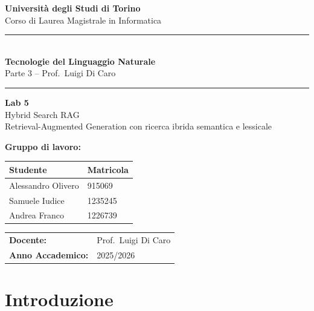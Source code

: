 \documentclass[12pt,a4paper]{article}
\newcommand{\HRule}{\rule{\linewidth}{0.5mm}}
\begin{document}
\raggedbottom

\begin{titlepage}
  \centering
  \vspace*{1.5cm}

  {\Large\textbf{Universit\`a degli Studi di Torino}\\[0.3em]
  Corso di Laurea Magistrale in Informatica}

  \vspace{1cm}
  \HRule\\[0.4em]
  {\LARGE\textbf{Tecnologie del Linguaggio Naturale}}\\[0.3em]
  {\large Parte 3 -- Prof.\ Luigi Di Caro}\\[0.2em]
  \HRule

  \vspace{1.2cm}
  {\huge\textbf{Lab 5}}\\[0.5em]
  {\LARGE Hybrid Search RAG}\\[0.4em]
  {\large Retrieval-Augmented Generation con ricerca ibrida semantica e lessicale}

  \vspace{2cm}

  {\large\textbf{Gruppo di lavoro:}}\\[0.8em]
  \begin{tabular}{ll}
    \toprule
    \textbf{Studente}    & \textbf{Matricola} \\
    \midrule
    Alessandro Olivero   & 915069  \\
    Samuele Iudice       & 1235245 \\
    Andrea Franco        & 1226739 \\
    \bottomrule
  \end{tabular}

  \vspace{1.5cm}
  \begin{tabular}{ll}
    \textbf{Docente:}          & Prof.\ Luigi Di Caro \\[0.3em]
    \textbf{Anno Accademico:}  & 2025/2026 \\
  \end{tabular}

  \vfill
\end{titlepage}

\tableofcontents
\newpage

\section{Introduzione}
\end{document}
